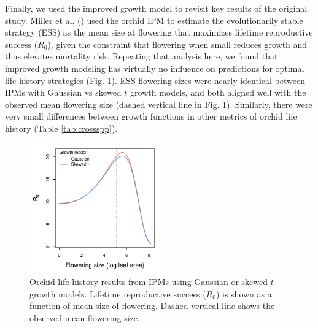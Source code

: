 \documentclass[12pt]{article}
\newcommand{\tom}[2]{{\color{red}{#1}}\footnote{\textit{\color{red}{#2}}}}
\begin{document}
Finally, we used the improved growth model to revisit key results of the original study. 
Miller et al. (\citeyear{miller2012evolutionary}) used the orchid IPM to estimate the evolutionarily stable strategy (ESS) as the mean size at flowering that maximizes lifetime reproductive success ($R_0$), given the constraint that flowering when small reduces growth and thus elevates mortality risk. 
Repeating that analysis here, we found that improved growth modeling has virtually no influence on predictions for optimal life history strategies (Fig. \ref{fig:orchid_ESS}). 
ESS flowering sizes were nearly identical between IPMs with Gaussian vs skewed $t$ growth models, and both aligned well with the observed mean flowering size (dashed vertical line in Fig. \ref{fig:orchid_ESS}). 
Similarly, there were very small differences between growth functions in other metrics of orchid life history (Table \ref{tab:crossspp}).

\begin{figure}[tbp]
	\centering
	\includegraphics[width=0.5\textwidth]{figures/orchid_R0.pdf}
	\caption{Orchid life history results from IPMs using Gaussian or skewed $t$ growth models. Lifetime reproductive success ($R_0$) is shown as a function of mean size of flowering. Dashed vertical line shows the observed mean flowering size.}
	\label{fig:orchid_ESS}
\end{figure} 
\end{document}
